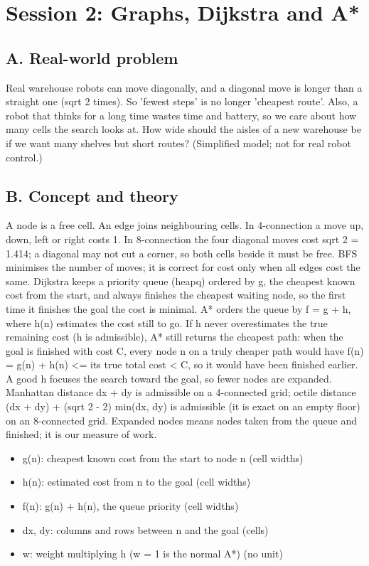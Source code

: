 \documentclass[11pt,a4paper]{article}
\begin{document}
\section{Session 2: Graphs, Dijkstra and A*}

\subsection*{A. Real-world problem}
Real warehouse robots can move diagonally, and a diagonal move is longer than a straight one (sqrt 2 times). So 'fewest steps' is no longer 'cheapest route'. Also, a robot that thinks for a long time wastes time and battery, so we care about how many cells the search looks at. How wide should the aisles of a new warehouse be if we want many shelves but short routes? (Simplified model; not for real robot control.)

\subsection*{B. Concept and theory}
A node is a free cell. An edge joins neighbouring cells. In 4-connection a move up, down, left or right costs 1. In 8-connection the four diagonal moves cost sqrt 2 = 1.414; a diagonal may not cut a corner, so both cells beside it must be free. BFS minimises the number of moves; it is correct for cost only when all edges cost the same. Dijkstra keeps a priority queue (heapq) ordered by g, the cheapest known cost from the start, and always finishes the cheapest waiting node, so the first time it finishes the goal the cost is minimal. A* orders the queue by f = g + h, where h(n) estimates the cost still to go. If h never overestimates the true remaining cost (h is admissible), A* still returns the cheapest path: when the goal is finished with cost C, every node n on a truly cheaper path would have f(n) = g(n) + h(n) \textless{}= its true total cost \textless{} C, so it would have been finished earlier. A good h focuses the search toward the goal, so fewer nodes are expanded. Manhattan distance dx + dy is admissible on a 4-connected grid; octile distance (dx + dy) + (sqrt 2 - 2) min(dx, dy) is admissible (it is exact on an empty floor) on an 8-connected grid. Expanded nodes means nodes taken from the queue and finished; it is our measure of work.

\begin{itemize}[nosep]
\item g(n): cheapest known cost from the start to node n (cell widths)
\item h(n): estimated cost from n to the goal (cell widths)
\item f(n): g(n) + h(n), the queue priority (cell widths)
\item dx, dy: columns and rows between n and the goal (cells)
\item w: weight multiplying h (w = 1 is the normal A*) (no unit)
\end{itemize}
\end{document}
